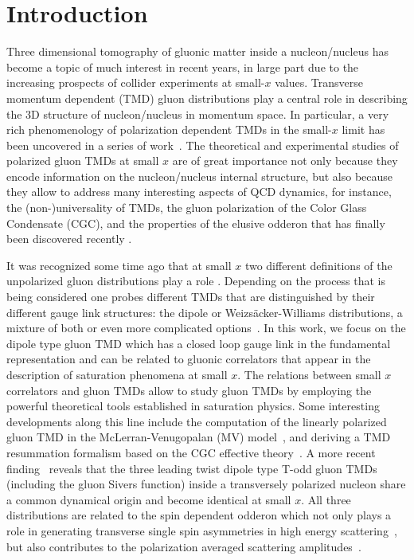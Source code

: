 \documentclass[prd,aps,preprintnumbers,fleqn,showpacs,nofootinbib,superscriptaddress]{revtex4}
\begin{document}
  \section{Introduction}
  Three dimensional tomography of gluonic matter inside a nucleon/nucleus has become a topic of much interest in recent years, in large part due to the increasing prospects of collider experiments at small-$x$ values. Transverse momentum dependent (TMD) gluon distributions play a central role in describing the 3D structure of nucleon/nucleus in momentum space. In particular, a very rich phenomenology of polarization dependent TMDs in the small-$x$ limit has been uncovered in a series of work~\cite{Metz:2011wb,Dominguez:2011br,Zhou:2013gsa,Szymanowski:2016mbq,Schafer:2013opa,Dumitru:2015gaa,Boer:2015pni,Hatta:2016dxp,Zhou:2016rnt,Iancu:2017fzn,Cougoulic:2019aja,Kovchegov:2015pbl,Kovchegov:2020hgb,Cougoulic:2020tbc,Boussarie:2019icw,Mantysaari:2019csc,Dumitru:2021tvw,Kovchegov:2021iyc,Bhattacharya:2022vvo,Hagiwara:2021xkf}. The theoretical and experimental studies of polarized gluon TMDs at small $x$ are of great importance not only because they encode information on the nucleon/nucleus internal structure, but also because they allow to address many interesting aspects of QCD dynamics, for instance, the (non-)universality of TMDs, the gluon polarization of the Color Glass Condensate (CGC), and the properties of the elusive odderon that has finally been discovered recently \cite{Abazov:2020rus}. 
  
It was recognized some time ago that at small $x$ two different definitions of the unpolarized gluon distributions play a role \cite{Kharzeev:2003wz}. Depending on the process that is being considered one probes different TMDs that are distinguished by their different gauge link structures: the dipole or Weizs\"acker-Williams distributions, a mixture of both or even more complicated options~\cite{Dominguez:2010xd,Dominguez:2011wm,Bomhof:2006dp}. In this work, we focus on the dipole type gluon TMD which has a closed loop gauge link in the fundamental representation and can be related to gluonic correlators that appear in the description of saturation phenomena at small $x$.  The relations between small $x$ correlators and gluon TMDs allow to study gluon TMDs by employing the powerful theoretical tools established  in saturation physics. Some interesting developments along this line include the computation of the linearly polarized gluon TMD in the McLerran-Venugopalan (MV) model~\cite{Metz:2011wb}, and deriving a TMD resummation formalism based on the CGC effective theory~\cite{Mueller:2013wwa,Zhou:2016tfe,Xiao:2017yya,Zhou:2018lfq}. A more recent finding~\cite{Boer:2015pni,Kovchegov:2021iyc} reveals that the three leading twist dipole type T-odd gluon TMDs (including the gluon Sivers function) inside a transversely polarized nucleon share a common dynamical origin and become identical at small $x$. All three distributions are related to the spin dependent odderon which not only plays a role in generating transverse single spin asymmetries in high energy scattering~\cite{Zhou:2013gsa,Dong:2018wsp,Yao:2018vcg,Santiago:2021shh,Kovchegov:2021iyc}, but also contributes to the polarization averaged scattering amplitudes~\cite{Boussarie:2019vmk,Hagiwara:2020mqb}. 
  
\end{document}
